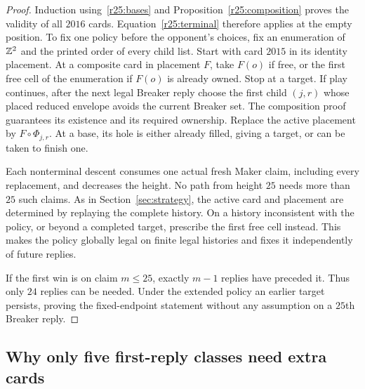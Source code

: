 \begin{proof}
Induction using~\eqref{r25:bases} and
Proposition~\ref{r25:composition} proves the validity of all $2016$
cards.  Equation~\eqref{r25:terminal} therefore applies at the empty
position.  To fix one policy before the opponent's choices, fix an
enumeration of $\mathbb Z^2$ and the printed order of every child list.
Start with card $2015$ in its identity placement.  At a composite
card in placement $F$, take $F(o)$ if free, or the first free cell
of the enumeration if $F(o)$ is already owned.  Stop at a target.
If play continues, after the next legal Breaker reply choose the
first child $(j,r)$ whose placed reduced envelope avoids the current
Breaker set.  The composition proof guarantees its existence and its
required ownership.  Replace the active placement by
$F\circ\Phi_{j,r}$.  At a base, its hole is either already filled,
giving a target, or can be taken to finish one.

Each nonterminal descent consumes one actual fresh Maker claim,
including every replacement, and decreases the height.  No path from
height $25$ needs more than $25$ such claims.  As in
Section~\ref{sec:strategy}, the active card and placement are determined
by replaying the complete history.  On a history inconsistent with
the policy, or beyond a completed target, prescribe the first free
cell instead.  This makes the policy globally legal on finite legal
histories and fixes it independently of future replies.

If the first win is on claim $m\leq25$, exactly $m-1$ replies have
preceded it.  Thus only $24$ replies can be needed.  Under the extended
policy an earlier target persists, proving the fixed-endpoint
statement without any assumption on a $25$th Breaker reply.
\end{proof}

\subsection{Why only five first-reply classes need extra cards}
\label{r25:opening}

